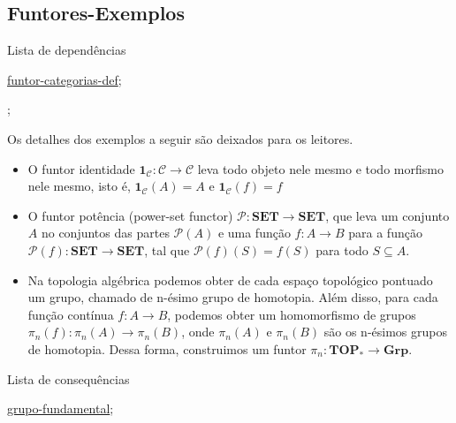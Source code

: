 \subsection{Funtores-Exemplos}
\label{funtor-categorias-ex}
\begin{titlemize}{Lista de dependências}
	\item \hyperref[funtor-categorias-def]{funtor-categorias-def};\\ %
	\item \hyperref[]{};\\
\end{titlemize}

\begin{ex}
	Os detalhes dos exemplos a seguir são deixados para os leitores.
\begin{itemize}

    \item O funtor identidade $\mathbf{1}_{\mathcal{C}}: \mathcal{C} \longrightarrow \mathcal{C}$ leva todo objeto nele mesmo e todo morfismo nele mesmo, isto é, $\mathbf{1}_{\mathcal{C}}(A) = A$ e $\mathbf{1}_{\mathcal{C}}(f) = f$
    
    \item O funtor potência (power-set functor) $\mathcal{P}:\mathbf{SET} \longrightarrow \mathbf{SET}$, que leva um conjunto $A$ no conjuntos das partes $\mathcal{P}(A)$ e uma função $f:A \longrightarrow B$ para a função $\mathcal{P}(f): \mathbf{SET} \longrightarrow \mathbf{SET}$, tal que $\mathcal{P}(f)(S) = f(S)$ para todo $S \subseteq A$.

    \item Na topologia algébrica podemos obter de cada espaço topológico pontuado um grupo, chamado de n-ésimo grupo de homotopia. Além disso, para cada função contínua $f: A \longrightarrow B$, podemos obter um homomorfismo de grupos $\pi_n(f):\pi_n(A) \longrightarrow \pi_n(B)$, onde $\pi_n(A)$ e $\pi_n(B)$ são os n-ésimos grupos de homotopia. Dessa forma, construimos um funtor $\pi_n: \mathbf{TOP}_* \longrightarrow \mathbf{Grp}$. 

\end{itemize}
\end{ex}

 

\begin{titlemize}{Lista de consequências}
	\item \hyperref[grupo-fundamental]{grupo-fundamental};\\ %
	\item \hyperref[]{}
\end{titlemize}
